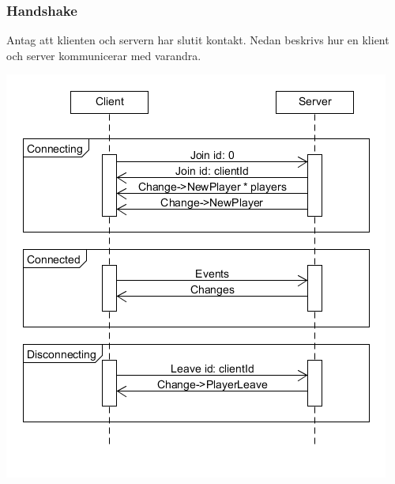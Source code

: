 \documentclass[10pt, titlepage, oneside, a4paper]{article}
\begin{document}
    	\newpage
    	\subsubsection{Handshake}
    	Antag att klienten och servern har slutit kontakt. Nedan beskrivs hur en klient och server kommunicerar med varandra.
    	
    	\begin{center}
    		\includegraphics[scale=.5]{./png/JoinProtocol.png}
    	\end{center}
\end{document}
